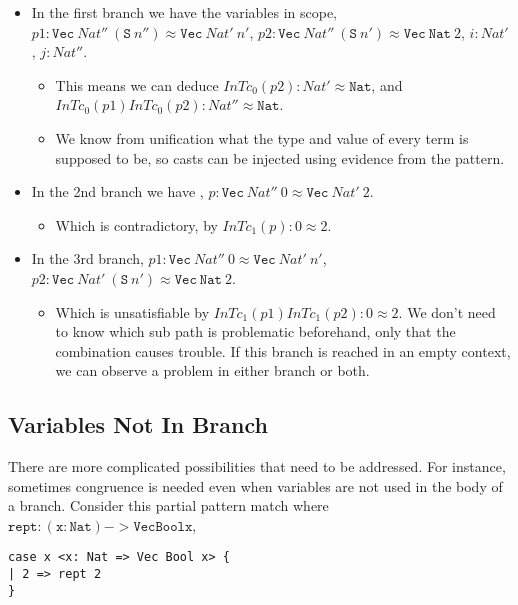 \begin{itemize}
\item
In the first branch we have the variables in scope, $p1:\mathtt{Vec}\ Nat''\ (\mathtt{S}\ n'')\approx\mathtt{Vec}\ Nat'\ n'$, $p2:\mathtt{Vec}\ Nat''\ (\mathtt{S}\ n')\approx\mathtt{Vec}\ \mathtt{Nat}\ 2$, $i:Nat'$, $j:Nat''$.
\begin{itemize}
\item
This means we can deduce $InTc_{0}(p2):Nat'\approx\mathtt{Nat}$, and $InTc_{0}(p1)InTc_{0}(p2):Nat''\approx\mathtt{Nat}$.
\item
We know from unification what the type and value of every term is supposed to be, so casts can be injected using evidence from the pattern.
\end{itemize}
\item
In the 2nd branch we have , $p:\mathtt{Vec}\ Nat''\ 0\approx\mathtt{Vec}\ Nat'\ 2$.
\begin{itemize}
\item
Which is contradictory, by $InTc_{1}(p):0\approx2$.
\end{itemize}
\item
{}
In the 3rd branch, $p1:\mathtt{Vec}\ Nat''\ 0\approx\mathtt{Vec}\ Nat'\ n'$, $p2:\mathtt{Vec}\ Nat'\ (\mathtt{S}\ n')\approx\mathtt{Vec}\ \mathtt{Nat}\ 2$.
\begin{itemize}
\item
Which is unsatisfiable by $InTc_{1}(p1)InTc_{1}(p2):0\approx2$.
We don't need to know which sub path is problematic beforehand, only that the combination causes trouble.
If this branch is reached in an empty context, we can observe a problem in either branch or both.
\end{itemize}
\end{itemize}
 
\subsection{Variables Not In Branch}
There are more complicated possibilities that need to be addressed.
For instance, sometimes congruence is needed even when variables are not used in the body of a branch.
Consider this partial pattern match where $\mathtt{rept: (x: Nat) -> Vec Bool x}$,
 
\begin{lstlisting}[basicstyle={\ttfamily\small}]
case x <x: Nat => Vec Bool x> {
| 2 => rept 2
}
\end{lstlisting}
 
